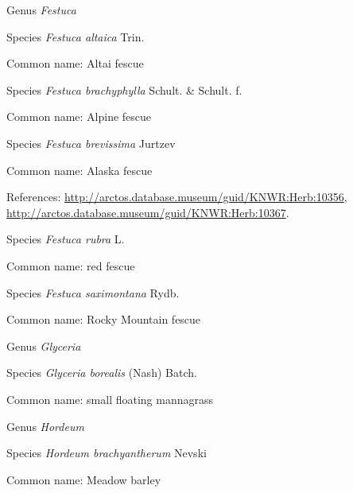\documentclass[9pt, article]{memoir}
\begin{document}
\begin{multicols}{2}
\vspace{6pt}\noindent\hspace{30pt}Genus \textit{Festuca}


\vspace{6pt}\noindent\hspace{36pt}Species \textit{Festuca altaica} Trin.


Common name: Altai fescue

\vspace{6pt}\noindent\hspace{36pt}Species \textit{Festuca brachyphylla} Schult. \& Schult. f.


Common name: Alpine fescue

\vspace{6pt}\noindent\hspace{36pt}Species \textit{Festuca brevissima} Jurtzev


Common name: Alaska fescue

References: 
\url{http://arctos.database.museum/guid/KNWR:Herb:10356}, 
\url{http://arctos.database.museum/guid/KNWR:Herb:10367}.

\vspace{6pt}\noindent\hspace{36pt}Species \textit{Festuca rubra} L.


Common name: red fescue

\vspace{6pt}\noindent\hspace{36pt}Species \textit{Festuca saximontana} Rydb.


Common name: Rocky Mountain fescue

\vspace{6pt}\noindent\hspace{30pt}Genus \textit{Glyceria}


\vspace{6pt}\noindent\hspace{36pt}Species \textit{Glyceria borealis} (Nash) Batch.


Common name: small floating mannagrass

\vspace{6pt}\noindent\hspace{30pt}Genus \textit{Hordeum}


\vspace{6pt}\noindent\hspace{36pt}Species \textit{Hordeum brachyantherum} Nevski


Common name: Meadow barley


\end{multicols}
\end{document}
